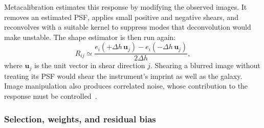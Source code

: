 Metacalibration estimates this response by modifying the observed images. It removes an estimated PSF, applies small positive and negative shears, and reconvolves with a suitable kernel to suppress modes that deconvolution would make unstable. The shape estimator is then run again:
\begin{equation}
    R_{ij}\simeq
    \frac{e_i(+\Delta h\,\boldsymbol{u}_j)-e_i(-\Delta h\,\boldsymbol{u}_j)}{2\Delta h},
    \label{eq:metacal}
\end{equation}
where $\boldsymbol{u}_j$ is the unit vector in shear direction $j$. Shearing a blurred image without treating its PSF would shear the instrument's imprint as well as the galaxy. Image manipulation also produces correlated noise, whose contribution to the response must be controlled~\cite{huff_metacalibration_2017,sheldon_practical_2017}.

\subsubsection{Selection, weights, and residual bias}


